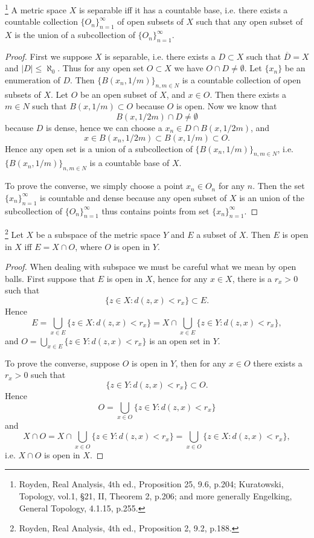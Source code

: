 \begin{proposition} \label{P:metric_base}
\footnote{Royden, Real Analysis, 4th ed., Proposition 25, 9.6, p.204; 
    Kuratowski, Topology, vol.1, \S 21, II, Theorem 2, p.206;
    and more generally Engelking, General Topology, 4.1.15, p.255.}
A metric space $X$ is separable iff it has a countable base, i.e. there exists a
countable collection $\{O_n\}_{n=1}^{\infty}$ of open subsets of $X$ such that
any open subset of $X$ is the union of a subcollection of 
$\{O_n\}_{n=1}^{\infty}$. 
\end{proposition}
\begin{proof}
First we suppose $X$ is separable, i.e. there exists a $D\subset X$ such that 
$\overline{D}=X$ and $|D|\leq\aleph_0$. Thus for any open set $O\subset X$ we have 
$O\cap D\neq\emptyset$. Let $\{x_n\}$ be an enumeration of $D$. Then 
$\{B(x_n,1/m)\}_{n,m\in N}$
is a countable collection of open subsets of $X$. Let $O$ be an open subset of
$X$, and $x\in O$. Then there exists a $m\in N$ such that $B(x,1/m)\subset O$
because $O$ is open. Now we know that 
\[
  B(x,1/2m)\cap D\neq \emptyset
\]
because $D$ is dense, hence we can choose a $x_n\in D\cap B(x,1/2m)$, and
\[
  x\in B(x_n,1/2m) \subset B(x,1/m) \subset O.
\]
Hence any open set is a union of a subcollection of $\{B(x_n,1/m)\}_{n,m\in N}$,
i.e. $\{B(x_n,1/m)\}_{n,m\in N}$ is a countable base of $X$.

To prove the converse, we simply choose a point $x_n\in O_n$ for any $n$. Then
the set $\{x_n\}_{n=1}^{\infty}$ is countable and dense because any open subset
of $X$ is an union of the subcollection of $\{O_n\}_{n=1}^{\infty}$ thus
contains points from set $\{x_n\}_{n=1}^{\infty}$.
\end{proof}

\begin{lemma}
\footnote{Royden, Real Analysis, 4th ed., Proposition 2, 9.2, p.188.} 
Let $X$ be a subspace of the metric space $Y$ and $E$ a subset of $X$. Then $E$
is open in $X$ iff $E=X\cap O$, where $O$ is open in $Y$.
\end{lemma}
\begin{proof}
When dealing with subspace we must be careful what we mean by open balls.
First suppose that $E$ is open in $X$, hence for any $x\in X$, there is a 
$r_x>0$ such that
\[
  \{z\in X: d(z,x)<r_x\} \subset E.
\]
Hence
\[
  E= \bigcup_{x\in E} \{ z\in X : d(z,x) < r_x \} 
   = X \cap \bigcup_{x\in E} \{ z\in Y : d(z,x) < r_x \},
\]
and $O= \bigcup_{x\in E} \{ z\in Y : d(z,x) < r_x \}$ is an open set in $Y$.

To prove the converse, suppose $O$ is open in $Y$, then for any $x\in O$ there
exists a $r_x>0$ such that
\[
  \{z\in Y: d(z,x)<r_x\} \subset O.
\]
Hence
\[
  O= \bigcup_{x\in O} \{ z\in Y : d(z,x) < r_x \} 
\]
and
\[
  X\cap O= X\cap \bigcup_{x\in O} \{ z\in Y : d(z,x) < r_x \} 
    = \bigcup_{x\in O} \{ z\in X : d(z,x) < r_x \},
\]
i.e. $X\cap O$ is open in $X$.
\end{proof}

